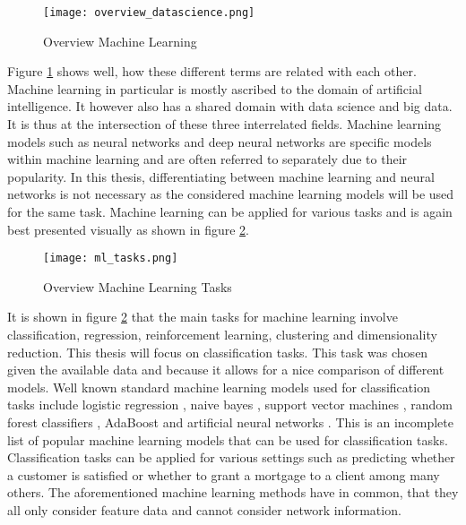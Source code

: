 	\begin{figure}[h]
		\centering
		\texttt{[image: overview\_datascience.png]}
		\caption{Overview Machine Learning}
		\citep{Frauenhofer2021}
		\label{fig:ml_overview}
	\end{figure} 

	\noindent Figure \ref{fig:ml_overview} shows well, how these different
	terms are related with each other. Machine learning in particular is
	mostly ascribed to the domain of artificial intelligence. It however also 
	has a shared domain with data science and big data. It is thus at the
	intersection of these three interrelated fields. Machine learning models 
	such as neural networks and deep neural networks are specific models within
	machine learning and are often referred to separately due to their
	popularity. In this thesis, differentiating between machine learning and
	neural networks is not necessary as the considered machine learning models
	will be used for the same task. Machine learning can be applied for various
	tasks and is again best presented visually as shown in figure 
	\ref{fig:ml_tasks}.

	\begin{figure}[h]
		\centering
		\texttt{[image: ml\_tasks.png]}
		\caption{Overview Machine Learning Tasks}
		\citep{Artisan2020}
		\label{fig:ml_tasks}
	\end{figure} 

	\noindent It is shown in figure \ref{fig:ml_tasks} that the main tasks for
	machine learning involve classification, regression, reinforcement
	learning, clustering and dimensionality reduction. This thesis will focus
	on classification tasks. This task was chosen given the available data and 
	because it allows for a nice comparison of different models. Well known 
	standard machine learning models used for classification tasks include 
	logistic regression \citep{cramer2002origins}, naive bayes 
	\citep{zhang2004bayes}, support vector machines 
	\citep{platt1999probabilistic}, random forest classifiers
	\citep{breiman2001random}, AdaBoost \citep{freund1997decision} and
	artificial neural networks \citep{mcculloch1943logical}. This is an
	incomplete list of popular machine learning models that can be used for
	classification tasks. Classification tasks can be applied for various
	settings such as predicting whether a customer is satisfied or whether to
	grant a mortgage to a client among many others. The aforementioned machine
	learning methods have in common, that they all only consider feature data
	and cannot consider network information. \\

